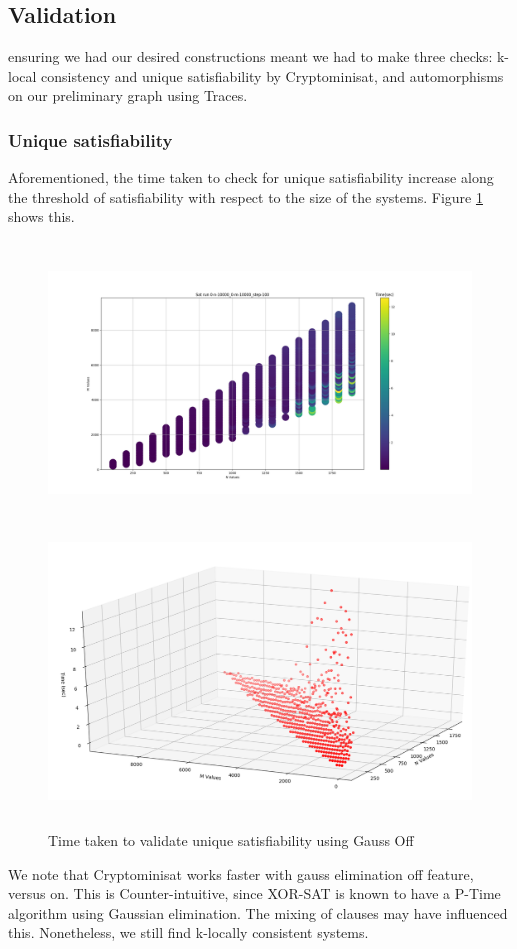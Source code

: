 \subsection{Validation}
ensuring we had our desired constructions meant we had to make three checks: k-local consistency and unique satisfiability by Cryptominisat, and automorphisms on our preliminary graph using Traces. 

\subsubsection{Unique satisfiability}
Aforementioned, the time taken to check for unique satisfiability increase along the threshold of satisfiability with respect to the size of the systems. Figure \ref{fig:hm} shows this.
\par
\begin{figure}[htbp!] 
	\centering
	\includegraphics[height=75mm]{Figs/figure_1}
	\\
	\includegraphics[height=75mm]{Figs/figure_2}
	\caption{Time taken to validate unique satisfiability using Gauss Off}
	\label{fig:hm}
\end{figure}
We note that Cryptominisat works faster with gauss elimination off feature, versus on. This is Counter-intuitive, since XOR-SAT is known to have a P-Time algorithm using Gaussian elimination. The mixing of clauses may have influenced this. Nonetheless, we still find k-locally consistent systems. 

